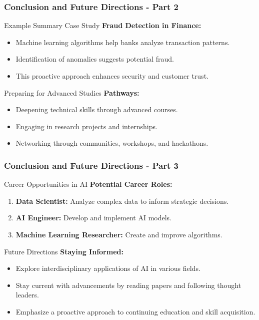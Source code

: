 \documentclass{beamer}
\begin{document}
\begin{frame}[fragile]
    \frametitle{Conclusion and Future Directions - Part 2}
    \begin{block}{Example Summary Case Study}
        \textbf{Fraud Detection in Finance:}
    \end{block}
    \begin{itemize}
        \item Machine learning algorithms help banks analyze transaction patterns.
        \item Identification of anomalies suggests potential fraud.
        \item This proactive approach enhances security and customer trust.
    \end{itemize}

    \begin{block}{Preparing for Advanced Studies}
        \textbf{Pathways:}
    \end{block}
    \begin{itemize}
        \item Deepening technical skills through advanced courses.
        \item Engaging in research projects and internships.
        \item Networking through communities, workshops, and hackathons.
    \end{itemize}
\end{frame}

\begin{frame}[fragile]
    \frametitle{Conclusion and Future Directions - Part 3}
    \begin{block}{Career Opportunities in AI}
        \textbf{Potential Career Roles:}
    \end{block}
    \begin{enumerate}
        \item \textbf{Data Scientist:} Analyze complex data to inform strategic decisions.
        \item \textbf{AI Engineer:} Develop and implement AI models.
        \item \textbf{Machine Learning Researcher:} Create and improve algorithms.
    \end{enumerate}

    \begin{block}{Future Directions}
        \textbf{Staying Informed:}
    \end{block}
    \begin{itemize}
        \item Explore interdisciplinary applications of AI in various fields.
        \item Stay current with advancements by reading papers and following thought leaders.
        \item Emphasize a proactive approach to continuing education and skill acquisition.
    \end{itemize}
\end{frame}
\end{document}

